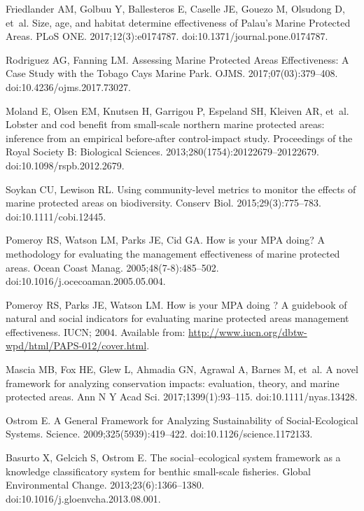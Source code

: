 \documentclass[10pt,letterpaper]{article}
\begin{document}
\begin{thebibliography}{10}
Friedlander AM, Golbuu Y, Ballesteros E, Caselle JE, Gouezo M, Olsudong D,
  et~al.
\newblock Size, age, and habitat determine effectiveness of Palau's Marine
  Protected Areas.
\newblock PLoS ONE. 2017;12(3):e0174787.
\newblock doi:{10.1371/journal.pone.0174787}.

Rodriguez AG, Fanning LM.
\newblock Assessing Marine Protected Areas Effectiveness: A Case Study with the
  Tobago Cays Marine Park.
\newblock OJMS. 2017;07(03):379--408.
\newblock doi:{10.4236/ojms.2017.73027}.

Moland E, Olsen EM, Knutsen H, Garrigou P, Espeland SH, Kleiven AR, et~al.
\newblock Lobster and cod benefit from small-scale northern marine protected
  areas: inference from an empirical before-after control-impact study.
\newblock Proceedings of the Royal Society B: Biological Sciences.
  2013;280(1754):20122679--20122679.
\newblock doi:{10.1098/rspb.2012.2679}.

Soykan CU, Lewison RL.
\newblock Using community-level metrics to monitor the effects of marine
  protected areas on biodiversity.
\newblock Conserv Biol. 2015;29(3):775--783.
\newblock doi:{10.1111/cobi.12445}.

Pomeroy RS, Watson LM, Parks JE, Cid GA.
\newblock How is your MPA doing? A methodology for evaluating the management
  effectiveness of marine protected areas.
\newblock Ocean Coast Manag. 2005;48(7-8):485--502.
\newblock doi:{10.1016/j.ocecoaman.2005.05.004}.

Pomeroy RS, Parks JE, Watson LM.
\newblock How is your MPA doing ? A guidebook of natural and social indicators
  for evaluating marine protected areas management effectiveness.
\newblock IUCN; 2004.
\newblock Available from:
  \url{http://www.iucn.org/dbtw-wpd/html/PAPS-012/cover.html}.

Mascia MB, Fox HE, Glew L, Ahmadia GN, Agrawal A, Barnes M, et~al.
\newblock A novel framework for analyzing conservation impacts: evaluation,
  theory, and marine protected areas.
\newblock Ann N Y Acad Sci. 2017;1399(1):93--115.
\newblock doi:{10.1111/nyas.13428}.

Ostrom E.
\newblock A General Framework for Analyzing Sustainability of Social-Ecological
  Systems.
\newblock Science. 2009;325(5939):419--422.
\newblock doi:{10.1126/science.1172133}.

Basurto X, Gelcich S, Ostrom E.
\newblock The social–ecological system framework as a knowledge
  classificatory system for benthic small-scale fisheries.
\newblock Global Environmental Change. 2013;23(6):1366--1380.
\newblock doi:{10.1016/j.gloenvcha.2013.08.001}.


\end{thebibliography}
\end{document}
